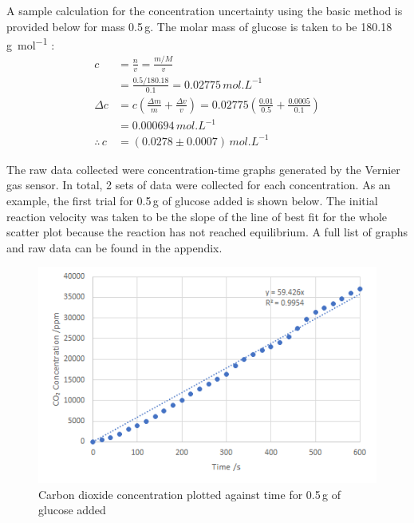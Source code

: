 \documentclass{article}
\begin{document}
A sample calculation for the concentration uncertainty using the basic method is provided below for mass 0.5\,\si{g}. The molar mass of glucose is taken to be 180.18\,\si{g.mol^{-1}} \parencite{ref}:
\begin{align*}
    c &= \frac{n}{v} = \frac{m/M}{v} \\
    &= \frac{0.5/180.18}{0.1} = 0.02775\,\si{mol.L^{-1}} \\  %
    \Delta c &= c\left(\frac{\Delta m}{m} + \frac{\Delta v}{v}\right) = 0.02775\left(\frac{0.01}{0.5} + \frac{0.0005}{0.1}\right) \\
    &= 0.000694\,\si{mol.L^{-1}} \\
    \therefore\,c &= (0.0278 \pm 0.0007)\,\si{mol.L^{-1}}
\end{align*}

The raw data collected were concentration-time graphs generated by the Vernier  gas sensor. In total, 2 sets of data were collected for each concentration. As an example, the first trial for 0.5\,\si{g} of glucose added is shown below. The initial reaction velocity was taken to be the slope of the line of best fit for the whole scatter plot because the reaction has not reached equilibrium. A full list of graphs and raw data can be found in the appendix.  %
\begin{figure}[H]
    \renewcommand{\figurename}{Graph}
    \centering
    \includegraphics{figures/graph_02.png}
    \vspace*{-12pt}
    \caption{Carbon dioxide concentration plotted against time for 0.5\,\si{g} of glucose added}
    \label{fig:graph2}
    \renewcommand{\figurename}{Figure}
\end{figure}
\end{document}
